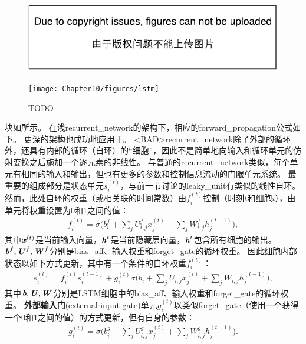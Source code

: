 
\begin{figure}[!htb]
\ifOpenSource
\centerline{\includegraphics{figure.pdf}}
\else
\centerline{\texttt{[image: Chapter10/figures/lstm]}}
\fi
\caption{TODO}
\label{fig:chap10_lstm}
\end{figure}

块如所示。
在浅\gls{recurrent_network}的架构下，相应的\gls{forward_propagation}公式如下。
更深的架构也成功地应用于\citep{Graves-et-al-ICASSP2013,Pascanu-et-al-ICLR2014}。
<BAD>\gls{recurrent_network}除了外部的循环外，还具有内部的循环（自环）的``细胞''，因此不是简单地向输入和循环单元的仿射变换之后施加一个逐元素的非线性。
与普通的\gls{recurrent_network}类似，每个单元有相同的输入和输出，但也有更多的参数和控制信息流动的门限单元系统。
最重要的组成部分是状态单元$s_i^{(t)}$，与前一节讨论的\gls{leaky_unit}有类似的线性自环。
然而，此处自环的权重（或相关联的时间常数）由$f_i^{(t)}$控制（时刻$t$和细胞$i$），由单元将权重设置为0和1之间的值：
\begin{align}
 f_i^{(t)} = \sigma \Big( b_i^f + \sum_j U_{i,j}^f x_j^{(t)} + \sum_j W_{i,j}^f h_j^{(t-1)} \Big),
\end{align}
其中$\boldsymbol{\mathit{x}}^{(t)}$是当前输入向量，$\boldsymbol{\mathit{h}}^{t}$是当前隐藏层向量，$\boldsymbol{\mathit{h}}^{t}$包含所有细胞的输出。 
$\boldsymbol{\mathit{b}}^f, \boldsymbol{\mathit{U}}^f, \boldsymbol{\mathit{W}}^f$分别是\gls{bias_aff}、输入权重和\gls{forget_gate}的循环权重。
因此细胞内部状态以如下方式更新，其中有一个条件的自环权重$f_i^{(t)}$：
\begin{align}
 s_i^{(t)} = f_i^{(t)}  s_i^{(t-1)} +  g_i^{(t)}
 \sigma \Big( b_i + \sum_j U_{i,j} x_j^{(t)} + \sum_j W_{i,j} h_j^{(t-1)} \Big),
\end{align}
其中$\boldsymbol{\mathit{b}}, \boldsymbol{\mathit{U}}, \boldsymbol{\mathit{W}}$分别是LSTM细胞中的\gls{bias_aff}、输入权重和\gls{forget_gate}的循环权重。
\textbf{外部输入门}(external input gate)单元$g_i^{(t)}$以类似\gls{forget_gate}（使用一个获得一个0和1之间的值）的方式更新，但有自身的参数：
\begin{align}
 g_i^{(t)} = \sigma \Big( b_i^g + \sum_j U_{i,j}^g x_j^{(t)} + \sum_j W_{i,j}^g h_j^{(t-1)} \Big).
\end{align}
